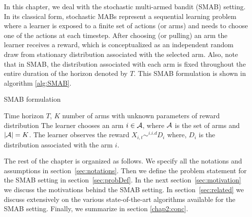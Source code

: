 In this chapter, we deal with the stochastic multi-armed bandit (SMAB) setting. In its classical form, stochastic MABs represent a sequential learning problem where a learner is exposed to a finite set of actions (or arms) and needs to choose one of the actions at each timestep. After choosing (or pulling) an arm the learner receives a reward, which is conceptualized as an independent random draw from stationary distribution associated with the selected arm. Also, note that in SMAB, the distribution associated with each arm is fixed throughout the entire duration of the horizon denoted by $T$. This SMAB formulation is shown in algorithm \ref{alg:SMAB}.

\begin{algorithm}[!th]
\caption{SMAB formulation}
\label{alg:SMAB}
\begin{algorithmic}
 Time horizon $T$, $K$ number of arms with unknown parameters of reward distribution
\State {}
\State The learner chooses an arm $i\in\mathcal{A}$, where $\mathcal{A}$ is the set of arms and $|\mathcal{A}|=K$.
\State The learner observes the reward $X_{i,t}\sim^{i.i.d} D_{i}$ where, $D_{i}$ is the distribution associated with the arm $i$. 
\State \EndFor
\end{algorithmic}
\end{algorithm}
	 
The rest of the chapter is organized as follows. We specify all the notations and assumptions in section~\ref{sec:notations}. Then we define the problem statement for the SMAB setting in section~\ref{sec:probDef}. In the next section~\ref{sec:motivation} we discuss the motivations behind the SMAB setting. In section~\ref{sec:related} we discuss extensively on the various state-of-the-art algorithms available for the SMAB setting. Finally, we summarize in section \ref{chap2:conc}.